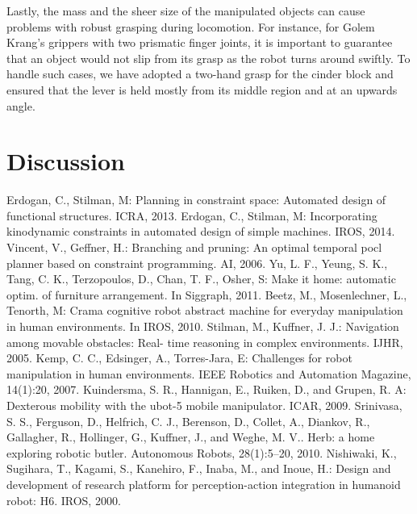 \documentclass[runningheads,a4paper]{llncs}
\begin{document}
Lastly, the mass and the sheer size of the manipulated objects can cause problems with robust
grasping during locomotion. For instance, for Golem Krang's grippers with two prismatic finger joints,
it is important to guarantee that an object would not slip from its grasp as the robot turns around
swiftly. To handle such cases, we have adopted a two-hand grasp for the cinder block and ensured
that the lever is held mostly from its middle region and at an upwards angle. 

\section{Discussion}

\begin{thebibliography}{27}

 Erdogan, C., Stilman, M: Planning in constraint space: Automated design of
functional structures. ICRA, 2013.
 Erdogan, C., Stilman, M: Incorporating kinodynamic constraints in automated
design of simple machines. IROS, 2014.
 Vincent, V., Geffner, H.: Branching and pruning: An optimal temporal pocl planner
based on constraint programming. AI, 2006.
 Yu, L. F., Yeung, S. K., Tang, C. K., Terzopoulos, D., Chan, T. F., Osher, S: Make it home:
automatic optim. of furniture arrangement. In Siggraph, 2011.
 Beetz, M., Mosenlechner, L., Tenorth, M: Crama cognitive robot
abstract machine for everyday manipulation in human environments. In IROS,
2010.
 Stilman, M., Kuffner, J. J.: Navigation among movable obstacles: Real-
time reasoning in complex environments. IJHR, 2005.
 Kemp, C. C., Edsinger, A., Torres-Jara, E: Challenges for robot
manipulation in human environments. IEEE Robotics and Automation Magazine,
14(1):20, 2007.
 Kuindersma, S. R., Hannigan, E., Ruiken, D., and Grupen, R. A:
Dexterous mobility with the ubot-5 mobile manipulator. ICAR, 2009.
  Srinivasa, S. S., Ferguson, D., Helfrich, C. J., Berenson, D., 
Collet, A., Diankov, R., Gallagher, R., Hollinger, G., Kuffner, J., and
Weghe, M. V.. Herb: a home exploring robotic butler. Autonomous Robots,
28(1):5–20, 2010.
 Nishiwaki, K., Sugihara, T., Kagami, S., Kanehiro, F.,
Inaba, M., and Inoue, H.: Design and development of research platform for perception-action 
integration in humanoid robot: H6. IROS, 2000.

\end{thebibliography}
\end{document}
